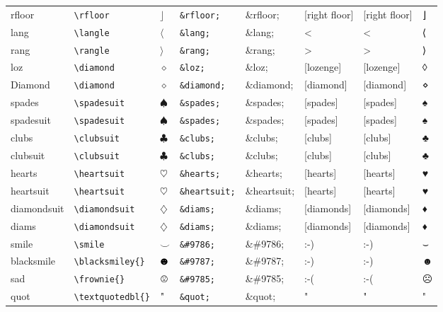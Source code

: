 \documentclass[11pt]{article}
\begin{document}
\begin{longtable}{llllllll}
rfloor & \texttt{\textbackslash{}rfloor} & $\rfloor$ & \texttt{\&rfloor;} & \&rfloor; & [right floor] & [right floor] & ⌋\\
lang & \texttt{\textbackslash{}langle} & $\langle$ & \texttt{\&lang;} & \&lang; & < & < & ⟨\\
rang & \texttt{\textbackslash{}rangle} & $\rangle$ & \texttt{\&rang;} & \&rang; & > & > & ⟩\\
loz & \texttt{\textbackslash{}diamond} & $\diamond$ & \texttt{\&loz;} & \&loz; & [lozenge] & [lozenge] & ◊\\
Diamond & \texttt{\textbackslash{}diamond} & $\diamond$ & \texttt{\&diamond;} & \&diamond; & [diamond] & [diamond] & ⋄\\
spades & \texttt{\textbackslash{}spadesuit} & $\spadesuit$ & \texttt{\&spades;} & \&spades; & [spades] & [spades] & ♠\\
spadesuit & \texttt{\textbackslash{}spadesuit} & $\spadesuit$ & \texttt{\&spades;} & \&spades; & [spades] & [spades] & ♠\\
clubs & \texttt{\textbackslash{}clubsuit} & $\clubsuit$ & \texttt{\&clubs;} & \&clubs; & [clubs] & [clubs] & ♣\\
clubsuit & \texttt{\textbackslash{}clubsuit} & $\clubsuit$ & \texttt{\&clubs;} & \&clubs; & [clubs] & [clubs] & ♣\\
hearts & \texttt{\textbackslash{}heartsuit} & $\heartsuit$ & \texttt{\&hearts;} & \&hearts; & [hearts] & [hearts] & ♥\\
heartsuit & \texttt{\textbackslash{}heartsuit} & $\heartsuit$ & \texttt{\&heartsuit;} & \&heartsuit; & [hearts] & [hearts] & ♥\\
diamondsuit & \texttt{\textbackslash{}diamondsuit} & $\diamondsuit$ & \texttt{\&diams;} & \&diams; & [diamonds] & [diamonds] & ♦\\
diams & \texttt{\textbackslash{}diamondsuit} & $\diamondsuit$ & \texttt{\&diams;} & \&diams; & [diamonds] & [diamonds] & ♦\\
smile & \texttt{\textbackslash{}smile} & $\smile$ & \texttt{\&\#9786;} & \&\#9786; & :-) & :-) & ⌣\\
blacksmile & \texttt{\textbackslash{}blacksmiley\{\}} & $\mbox{\blacksmiley{}}$ & \texttt{\&\#9787;} & \&\#9787; & :-) & :-) & ☻\\
sad & \texttt{\textbackslash{}frownie\{\}} & $\mbox{\frownie{}}$ & \texttt{\&\#9785;} & \&\#9785; & :-( & :-( & ☹\\
quot & \texttt{\textbackslash{}textquotedbl\{\}} & $\mbox{\textquotedbl{}}$ & \texttt{\&quot;} & \&quot; & " & " & "\\

\end{longtable}
\end{document}
